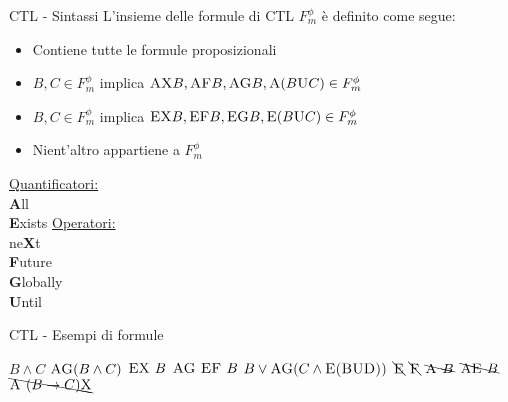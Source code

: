 \documentclass{beamer}
\begin{document}
\begin{frame}{CTL - Sintassi}
    L'insieme delle formule di CTL $F_m^\phi$ è definito come segue:
    \begin{itemize}
        \item Contiene tutte le formule proposizionali
        \item $B,C \in F_m^\phi$ implica $\textsc{AX}B,\textsc{AF}B,\textsc{AG}B,\textsc{A}(B\textsc{U}C) \in F_m^\phi$
        \item $B,C \in F_m^\phi$ implica $\textsc{EX}B,\textsc{EF}B,\textsc{EG}B,\textsc{E}(B\textsc{U}C) \in F_m^\phi$
        \item Nient'altro appartiene a $F_m^\phi$
    \end{itemize}
    \vspace{1em}
    \begin{center}
        \begin{multicols}{2}
            \underline{Quantificatori:}\\\vspace{1em}
            \textbf{A}ll\\
            \textbf{E}xists
            \endgraf
            \columnbreak
            \underline{Operatori:}\\\vspace{1em}
            ne\textbf{X}t\\
            \textbf{F}uture\\
            \textbf{G}lobally\\
            \textbf{U}ntil
        \end{multicols}
    \end{center}
\end{frame}

\begin{frame}{CTL - Esempi di formule}
    \begin{multicols}{2}
        $B \land C$\endgraf\bigskip
        $\textsc{AG}(B \land C)$\endgraf\bigskip
        $\textsc{EX }B$\endgraf\bigskip
        $\textsc{AG EF }B$\endgraf\bigskip
        $B \lor \textsc{AG}(C \land \textsc{E(B\textsc{U}D)})$\endgraf
        \endgraf
        \columnbreak
        \hspace{2em}
        $\bcancel{\textsc{E}}$\endgraf\bigskip
        \hspace{2em}
        $\bcancel{\textsc{F}}$\endgraf\bigskip
        \hspace{2em}
        $\bcancel{\textsc{A }B}$\endgraf\bigskip
        \hspace{2em}
        $\bcancel{\textsc{AE }B}$\endgraf\bigskip
        \hspace{2em}
        $\bcancel{\textsc{A }(B \to C)\textsc{X}}$\endgraf\bigskip
    \end{multicols}
\end{frame}
\end{document}
